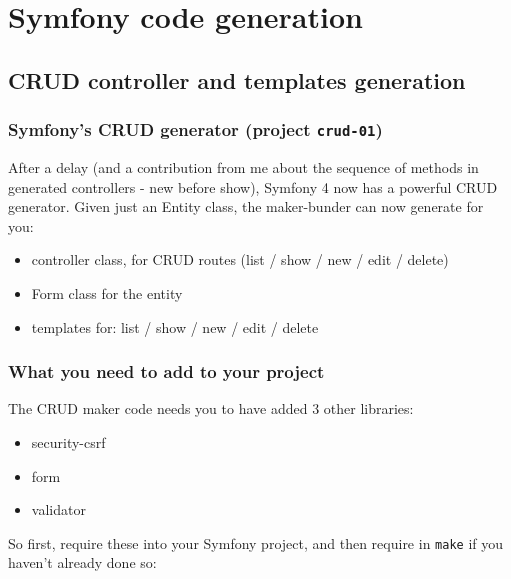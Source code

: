 \documentclass[a4paperpaper,openright]{book}
\begin{document}
\part{Symfony code generation}

\hypertarget{crud-controller-and-templates-generation}{%
\chapter{CRUD controller and templates
generation}\label{crud-controller-and-templates-generation}}

\hypertarget{symfonys-crud-generator-project-crud-01}{%
\section{\texorpdfstring{Symfony's CRUD generator (project
\texttt{crud-01})}{Symfony's CRUD generator (project crud-01)}}\label{symfonys-crud-generator-project-crud-01}}

After a delay (and a contribution from me about the sequence of methods
in generated controllers - new before show), Symfony 4 now has a
powerful CRUD generator. Given just an Entity class, the maker-bunder
can now generate for you:

\begin{itemize}
\item
  controller class, for CRUD routes (list / show / new / edit / delete)
\item
  Form class for the entity
\item
  templates for: list / show / new / edit / delete
\end{itemize}

\hypertarget{what-you-need-to-add-to-your-project}{%
\section{What you need to add to your
project}\label{what-you-need-to-add-to-your-project}}

The CRUD maker code needs you to have added 3 other libraries:

\begin{itemize}
\item
  security-csrf
\item
  form
\item
  validator
\end{itemize}

So first, require these into your Symfony project, and then require in
\texttt{make} if you haven't already done so:
\end{document}
